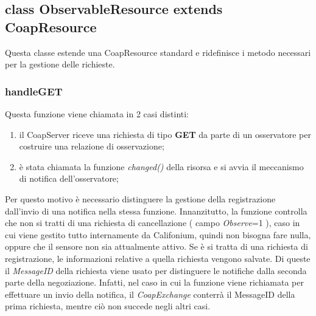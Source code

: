 		\subsection { class ObservableResource extends CoapResource}
			Questa classe estende una CoapResource standard e ridefinisce i metodo necessari per la gestione delle richieste.
			\subsubsection{handleGET}
				Questa funzione viene chiamata in 2 casi distinti:
				\begin{enumerate}
					\item il CoapServer riceve una richiesta di tipo \textbf{GET} da parte di un osservatore per costruire una relazione di osservazione;
					\item è stata chiamata la funzione \textit{changed()} della risorsa e si avvia il meccanismo di notifica dell'osservatore;
				\end{enumerate}
				Per questo motivo è necessario distinguere la gestione della registrazione dall'invio di una notifica nella stessa funzione. \newline
				Innanzitutto, la funzione controlla che non si tratti di una richiesta di cancellazione ( campo \textit{Observe}=1 ), caso in cui viene gestito tutto internamente da Califonium, quindi non bisogna fare nulla, oppure che il sensore non sia attualmente attivo. \newline
				Se è si tratta di una richiesta di registrazione, le informazioni relative a quella richiesta vengono salvate. Di queste il \textit{MessageID} della richiesta viene usato per distinguere le notifiche dalla seconda parte della negoziazione. Infatti, nel caso in cui la funzione viene richiamata per effettuare un invio della notifica, il \textit{CoapExchange} conterrà il MessageID della prima richiesta, mentre ciò non succede negli altri casi.

